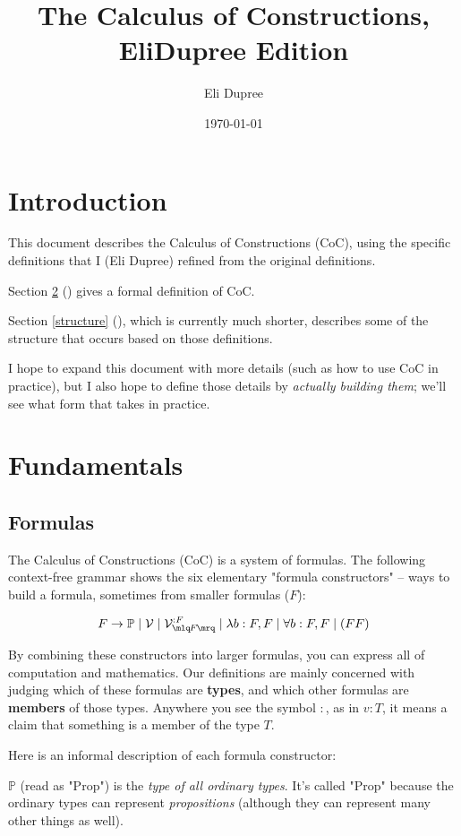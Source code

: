 \documentclass{article}
\title{The Calculus of Constructions, EliDupree Edition}
\author{Eli Dupree}
\date{\today}
\newcommand{\Prop}{\mathbb{P}}
\newcommand{\usage}{\mathcal{V}}
\newcommand{\usageKnown}[2]{{\usage_{\mlq\hspace{-0.06em}#2\hspace{-0.06em}\mrq}^{:#1}}}
\begin{document}
  \maketitle
  
  \section{Introduction}
  
  This document describes the Calculus of Constructions (CoC), using the specific definitions that I (Eli Dupree) refined from the original definitions.
  
  Section \ref{fundamentals} (\textit{}) gives a formal definition of CoC.
  
  Section \ref{structure} (\textit{}), which is currently much shorter, describes some of the structure that occurs based on those definitions.
  
  I hope to expand this document with more details (such as how to use CoC in practice), but I also hope to define those details by \emph{actually building them}; we'll see what form that takes in practice.
  

  \section{Fundamentals}\label{fundamentals}
  \subsection{Formulas}

  The Calculus of Constructions (CoC) is a system of formulas. The following context-free grammar shows the six elementary "formula constructors" – ways to build a formula, sometimes from smaller formulas ($F$):

  \[ F \rightarrow \Prop \mid \usage \mid \usageKnown{F}{F} \mid \lambda b:F,F \mid \forall b:F,F \mid (F F) \]
  
  By combining these constructors into larger formulas, you can express all of computation and mathematics. Our definitions are mainly concerned with judging which of these formulas are \textbf{types}, and which other formulas are \textbf{members} of those types. Anywhere you see the symbol $:$, as in $v : T$, it means a claim that something is a member of the type $T$.

  Here is an informal description of each formula constructor:

  $\Prop$ (read as "Prop") is the \emph{type of all ordinary types}. It's called "Prop" because the ordinary types can represent \emph{propositions} (although they can represent many other things as well).
  
\end{document}
